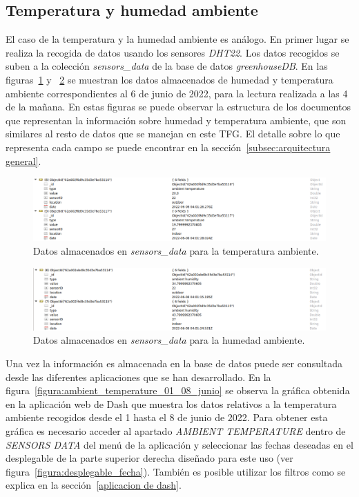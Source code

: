 \documentclass[a4paper, 12pt, oneside]{book}
\begin{document}
\subsection{Temperatura y humedad ambiente}
\label{subsec: temperatura y humedad ambiente}
El caso de la temperatura y la humedad ambiente es análogo. En primer lugar se realiza la recogida de datos usando los sensores \textit{DHT22}. Los datos recogidos se suben a la colección \textit{sensors\_data} de la base de datos \textit{greenhouseDB}. En las figuras~\ref{figura:robo3t_ambient_temperature} y ~\ref{figura:robo3t_ambient_humidity} se muestran los datos almacenados de humedad y temperatura ambiente correspondientes al 6 de junio de 2022, para la lectura realizada a las 4 de la mañana. En estas figuras se puede observar la estructura de los documentos que representan la información sobre humedad y temperatura ambiente, que son similares al resto de datos que se manejan en este TFG. El detalle sobre lo que representa cada campo se puede encontrar en la sección~\ref{subsec:arquitectura general}.

\begin{figure}[H]
	\centering
    \includegraphics[width=12cm, keepaspectratio]{img/robo3t_ambient_temperature}
    \caption{Datos almacenados en \textit{sensors\_data} para la temperatura ambiente.}
    \label{figura:robo3t_ambient_temperature}
\end{figure}
\begin{figure}[H]
	\centering
    \includegraphics[width=12cm, keepaspectratio]{img/robo3t_ambient_humidity}
    \caption{Datos almacenados en \textit{sensors\_data} para la humedad ambiente.}
    \label{figura:robo3t_ambient_humidity}
\end{figure} 

Una vez la información es almacenada en la base de datos puede ser consultada desde las diferentes aplicaciones que se han desarrollado.
En la figura~\ref{figura:ambient_temperature_01_08_junio} se observa la gráfica obtenida en la aplicación web de Dash que muestra los datos relativos a la temperatura ambiente recogidos desde el 1 hasta el 8 de junio de 2022. Para obtener esta gráfica es necesario acceder al apartado \textit{AMBIENT TEMPERATURE} dentro de \textit{SENSORS DATA} del menú de la aplicación y seleccionar las fechas deseadas en el desplegable de la parte superior derecha diseñado para este uso (ver figura~\ref{figura:desplegable_fecha}). También es posible utilizar los filtros como se explica en la sección~\ref{aplicacion de dash}.
\end{document}
